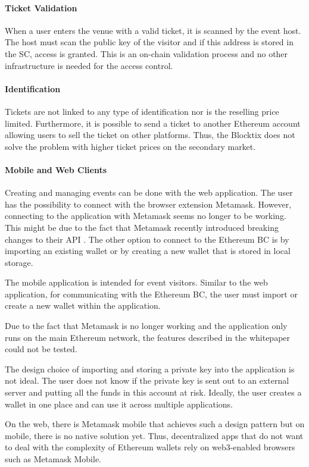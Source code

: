 \paragraph{Ticket Validation}
When a user enters the venue with a valid ticket, it is scanned by the event host. The host must scan the public key of the visitor and if this address is stored in the SC, access is granted. This is an on-chain validation process and no other infrastructure is needed for the access control.

\paragraph{Identification}
Tickets are not linked to any type of identification nor is the reselling price limited. Furthermore, it is possible to send a ticket to another Ethereum account allowing users to sell the ticket on other platforms. Thus, the Blocktix does not solve the problem with higher ticket prices on the secondary market. 

\paragraph{Mobile and Web Clients}
Creating and managing events can be done with the web application. The user has the possibility to connect with the browser extension Metamask. However, connecting to the application with Metamask seems no longer to be working. This might be due to the fact that Metamask recently introduced breaking changes to their API \cite{metamask-breaking-changes}. The other option to connect to the Ethereum BC is by importing an existing wallet or by creating a new wallet that is stored in local storage. 

The mobile application is intended for event visitors. Similar to the web application, for communicating with the Ethereum BC, the user must import or create a new wallet within the application.

Due to the fact that Metamask is no longer working and the application only runs on the main Ethereum network, the features described in the whitepaper could not be tested.

The design choice of importing and storing a private key into the application is not ideal. The user does not know if the private key is sent out to an external server and putting all the funds in this account at risk. Ideally, the user creates a wallet in one place and can use it across multiple applications.

On the web, there is Metamask mobile that achieves such a design pattern but on mobile, there is no native solution yet. Thus, decentralized apps that do not want to deal with the complexity of Ethereum wallets rely on web3-enabled browsers such as Metamask Mobile. 
